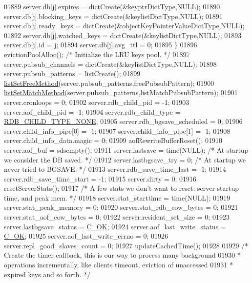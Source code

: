 \begin{DoxyCode}
{{{{{{{{{{{{{{{{{{{{{{{{{{{{01889         server.db[j].expires = dictCreate(&keyptrDictType,NULL);
01890         server.db[j].blocking\_keys = dictCreate(&keylistDictType,NULL);
01891         server.db[j].ready\_keys = dictCreate(&objectKeyPointerValueDictType,NULL);
01892         server.db[j].watched\_keys = dictCreate(&keylistDictType,NULL);
01893         server.db[j].id = j;
01894         server.db[j].avg\_ttl = 0;
01895     \}
01896     evictionPoolAlloc(); \textcolor{comment}{/* Initialize the LRU keys pool. */}
01897     server.pubsub\_channels = dictCreate(&keylistDictType,NULL);
01898     server.pubsub\_patterns = listCreate();
01899     \hyperlink{adlist_8h_a648e4a2d20decff3182a72a608b0b8f2}{listSetFreeMethod}(server.pubsub\_patterns,freePubsubPattern);
01900     \hyperlink{adlist_8h_a3dac429a545f8def9a2bf9077eb66ddc}{listSetMatchMethod}(server.pubsub\_patterns,listMatchPubsubPattern);
01901     server.cronloops = 0;
01902     server.rdb\_child\_pid = -1;
01903     server.aof\_child\_pid = -1;
01904     server.rdb\_child\_type = \hyperlink{server_8h_acfd6e0670ac08e8f4c13f33c8a2c6b5e}{RDB\_CHILD\_TYPE\_NONE};
01905     server.rdb\_bgsave\_scheduled = 0;
01906     server.child\_info\_pipe[0] = -1;
01907     server.child\_info\_pipe[1] = -1;
01908     server.child\_info\_data.magic = 0;
01909     aofRewriteBufferReset();
01910     server.aof\_buf = sdsempty();
01911     server.lastsave = time(NULL); \textcolor{comment}{/* At startup we consider the DB saved. */}
01912     server.lastbgsave\_try = 0;    \textcolor{comment}{/* At startup we never tried to BGSAVE. */}
01913     server.rdb\_save\_time\_last = -1;
01914     server.rdb\_save\_time\_start = -1;
01915     server.dirty = 0;
01916     resetServerStats();
01917     \textcolor{comment}{/* A few stats we don't want to reset: server startup time, and peak mem. */}
01918     server.stat\_starttime = time(NULL);
01919     server.stat\_peak\_memory = 0;
01920     server.stat\_rdb\_cow\_bytes = 0;
01921     server.stat\_aof\_cow\_bytes = 0;
01922     server.resident\_set\_size = 0;
01923     server.lastbgsave\_status = \hyperlink{server_8h_a303769ef1065076e68731584e758d3e1}{C\_OK};
01924     server.aof\_last\_write\_status = \hyperlink{server_8h_a303769ef1065076e68731584e758d3e1}{C\_OK};
01925     server.aof\_last\_write\_errno = 0;
01926     server.repl\_good\_slaves\_count = 0;
01927     updateCachedTime();
01928 
01929     \textcolor{comment}{/* Create the timer callback, this is our way to process many background}
01930 \textcolor{comment}{     * operations incrementally, like clients timeout, eviction of unaccessed}
01931 \textcolor{comment}{     * expired keys and so forth. */}
}}}}}}}}}}}}}}}}}}}}}}}}}}}}
\end{DoxyCode}
